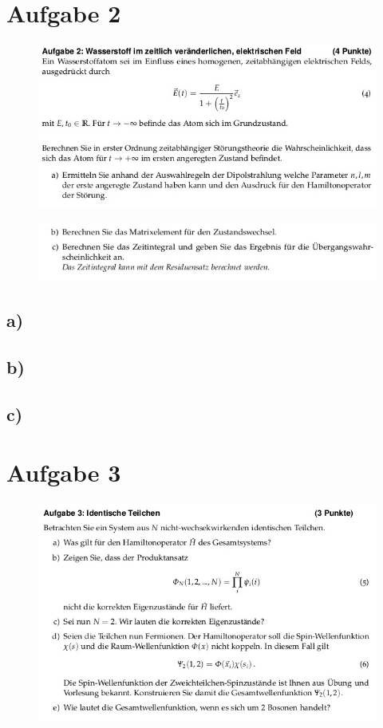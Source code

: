 \section{Aufgabe 2}
\begin{figure}[H]
    \centering
    \includegraphics[width=\textwidth]{images/ex2a.jpg}
\end{figure}
\begin{figure}[H]
    \centering
    \includegraphics[width=\textwidth]{images/ex2b.jpg}
\end{figure}
\subsection{a)}


\subsection{b)}


\subsection{c)}


\section{Aufgabe 3}
\begin{figure}[H]
    \centering
    \includegraphics[width=\textwidth]{images/ex3.jpg}
\end{figure}
